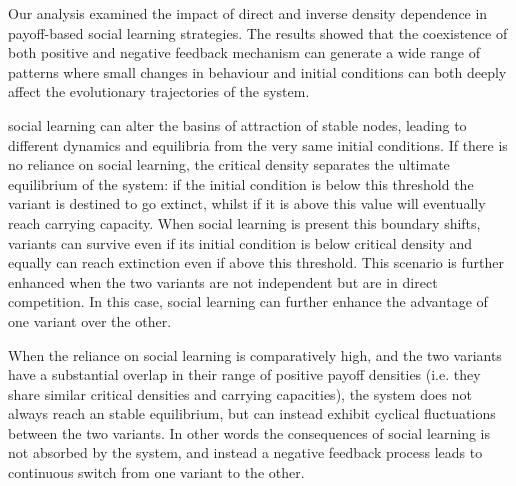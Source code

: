 \documentclass[review,authoryear]{elsarticle}
\begin{document}
Our analysis examined the impact of direct and inverse density dependence in payoff-based social learning strategies. The results showed that the coexistence of both positive and negative feedback mechanism can generate a wide range of patterns where small changes in behaviour and initial conditions can both deeply affect the evolutionary trajectories of the system. 



social learning can alter the basins of attraction of stable nodes, leading to different dynamics and equilibria from the very same initial conditions. If there is no reliance on social learning, the critical density separates the ultimate equilibrium of the system: if the initial condition is below this threshold the variant is destined to go extinct, whilst if it is above this value will eventually reach carrying capacity. When social learning is present this boundary shifts, variants can survive even if its initial condition is below critical density and equally can reach extinction even if above this threshold. This scenario is further enhanced when the two variants are not independent but are in direct competition. In this case, social learning can further enhance the advantage of one variant over the other. 

When the reliance on social learning is comparatively high, and the two variants have a substantial overlap in their range of positive payoff densities (i.e. they share similar critical densities and carrying capacities), the system does not always reach an stable equilibrium, but can instead exhibit cyclical fluctuations between the two variants. In other words the consequences of social learning is not absorbed by the system, and instead a negative feedback process leads to continuous switch from one variant to the other. 
\end{document}
